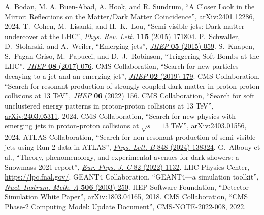 \begin{thebibliography}{99}
 A. Bodan, M. A. Buen-Abad, A. Hook, and R. Sundrum, ``A Closer Look in the Mirror: Reflections on the Matter/Dark Matter Coincidence'', \href{https://arxiv.org/abs/2401.12286}{arXiv:2401.12286}, 2024.
 T.~Cohen, M.~Lisanti, and H.~K.~Lou, ``Semi-visible jets: Dark matter undercover at the {LHC}'', \href{https://doi.org/10.1103/PhysRevLett.115.171804}{\textit{Phys. Rev. Lett.} \textbf{115} (2015) 171804}.
 P.~Schwaller, D.~Stolarski, and A.~Weiler, ``Emerging jets'', \href{http://dx.doi.org/10.1007/JHEP05(2015)059}{\textit{JHEP} \textbf{05} (2015) 059}.
 S.~Knapen, S.~Pagan Griso, M.~Papucci, and D.~J.~Robinson, ``Triggering Soft Bombs at the LHC'', \href{http://dx.doi.org/10.1007/JHEP08(2017)076}{\textit{JHEP} \textbf{08} (2017) 076}.
 CMS Collaboration, ``Search for new particles decaying to a jet and an emerging jet'', \href{https://doi.org/10.1007/JHEP02(2019)179}{\textit{JHEP} \textbf{02} (2019) 179}.
 CMS Collaboration, ``Search for resonant production of strongly coupled dark matter in proton-proton collisions at 13 TeV'', \href{https://doi.org/10.1007/JHEP06(2022)156}{\textit{JHEP} \textbf{06} (2022) 156}.
 CMS Collaboration, ``Search for soft unclustered energy patterns in proton-proton collisions at 13 TeV'', \href{https://arxiv.org/abs/2403.05311}{arXiv:2403.05311}, 2024.
 CMS Collaboration, ``Search for new physics with emerging jets in proton-proton collisions at $\sqrt{s}=13$ TeV'', \href{https://arxiv.org/abs/2403.01556}{arXiv:2403.01556}, 2024.
 ATLAS Collaboration, ``Search for non-resonant production of semi-visible jets using Run 2 data in ATLAS'', \href{https://doi.org/10.1016/j.physletb.2023.138324}{\textit{Phys. Lett. B} 848 (2024) 138324}.
 G.~Albouy et al., ``Theory, phenomenology, and experimental avenues for dark showers: a Snowmass 2021 report'', \href{https://doi.org/10.1140/epjc/s10052-022-11048-8}{\textit{Eur. Phys. J. C} 82 (2022) 1132}.
 LHC Physics Center, \href{https://lpc.fnal.gov/}{https://lpc.fnal.gov/}.
 {GEANT4} Collaboration, ``{GEANT4}---a simulation toolkit'', \href{http://dx.doi.org/10.1016/S0168-9002(03)01368-8}{\textit{Nucl. Instrum. Meth. A} \textbf{506} (2003) 250}.
 HEP Software Foundation, ``Detector Simulation White Paper'', \href{https://arxiv.org/abs/1803.04165}{arXiv:1803.04165}, 2018.
 CMS Collaboration, ``CMS Phase-2 Computing Model: Update Document'', \href{https://cds.cern.ch/record/2815292}{CMS-NOTE-2022-008}, 2022.

\end{thebibliography}
